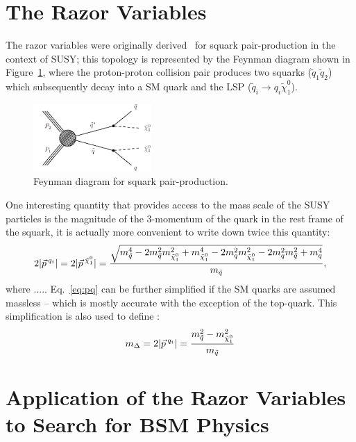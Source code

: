 \section{The Razor Variables}\label{razorVariables}
The razor variables were originally derived~\cite{rogan,razor2010} for
squark pair-production in the context of SUSY; this topology is
represented by the Feynman diagram shown in Figure~\ref{fig:squarkpair}, where
the proton-proton collision pair produces two squarks ($\tilde{q}_{1}\tilde{q}_{2}$) which
subsequently decay into a SM quark and the LSP ($\tilde{q}_{i}\rightarrow q_{i}\tilde{\chi}_{1}^{0}$).

\begin{figure}
 \centering
\includegraphics[width=0.4\textwidth]{RazorVariables/T2qq.pdf}
 \caption{Feynman diagram for squark pair-production.\label{fig:squarkpair}}
\end{figure}
One interesting quantity that provides access to the mass scale of the
SUSY particles is the magnitude of the 3-momentum of the quark in the
rest frame of the squark, it is actually more convenient to write down
twice this quantity:
\begin{equation}
\label{eq:pq}
2|\vec{p}^{\hspace{0.06cm}q_{i}}| =
2|\vec{p}^{\hspace{0.06cm}\tilde{\chi}_{1}^{0}}| =
\frac{\sqrt{m^{4}_{\tilde{q}} -
2m^{2}_{\tilde{q}}m^{2}_{\tilde{\chi}_{1}^{0}} +
m^{4}_{\tilde{\chi}_{1}^{0}} - 2m^{2}_{q}m^{2}_{\tilde{\chi}_{1}^{0}}
- 2m^{2}_{q}m^{2}_{\tilde{q}} + m_{q}^{4}}}{m_{\tilde{q}}},
\end{equation}
 where ..... Eq.~\ref{eq:pq} can be further simplified if the SM
 quarks are assumed massless -- which is mostly accurate with the
 exception of the top-quark. This simplification is also used to
 define :
\begin{equation}
\label{eq:Mdelta}
m_{\Delta} = 2|\vec{p}^{\hspace{0.06cm}q_{i}}| =
\frac{m^{2}_{\tilde{q}} -
m^{2}_{\tilde{\chi}_{1}^{0}}}{m_{\tilde{q}}}
\end{equation}

\section{Application of the Razor Variables to Search for BSM Physics}\label{razorApp}


